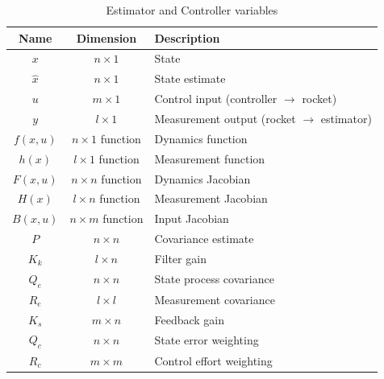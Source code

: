 \begin{table}[ht]
\begin{center}
\begin{tabular}{c c l}
Name & Dimension  & Description \\
\hline 
$x$ & $n {\times} 1$ & State\\
$\hat x$ & $n {\times} 1$ & State estimate\\
$u$ & $m {\times} 1$ & Control input (controller $\rightarrow$ rocket) \\
$y$ & $l {\times} 1$ & Measurement output (rocket $\rightarrow$ estimator)\\
\hline
$f(x,u)$ & $n {\times} 1$ function & Dynamics function \\
$h(x)$ & $l {\times} 1$ function & Measurement function \\
$F(x, u)$ & $n {\times} n$ function & Dynamics Jacobian  \\
$H(x)$ & $l {\times} n$ function & Measurement Jacobian  \\
$B(x, u)$ & $n {\times} m$  function & Input Jacobian  \\
\hline
$P$ & $n {\times} n$  & Covariance estimate \\
$K_k$ & $l {\times} n$  & Filter gain  \\
$Q_e$ & $n {\times} n$  & State process covariance  \\
$R_e$ & $l {\times} l$  & Measurement covariance  \\
\hline
$K_s$ & $m {\times} n$  & Feedback gain  \\
$Q_c$ & $n {\times} n$  & State error weighting  \\
$R_c$ & $m {\times} m$  & Control effort weighting 
\end{tabular}
\end{center}
\caption{Estimator and Controller variables} \label{tab:symbols_theory}
\end{table}

